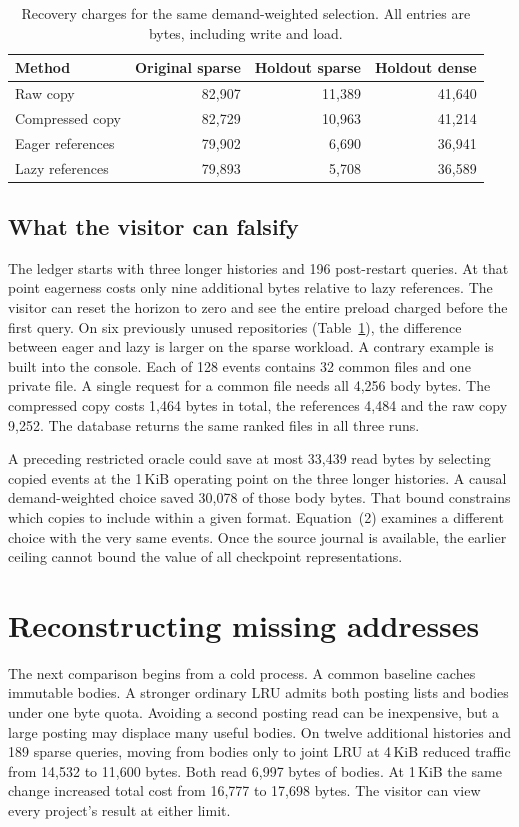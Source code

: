 \documentclass[conference]{IEEEtran}
\begin{document}
\begin{table}[t]\centering
\caption{Recovery charges for the same demand-weighted selection. All entries are bytes, including write and load.}\label{tab:restart}
\begin{tabular}{lrrr}\toprule
Method & Original sparse & Holdout sparse & Holdout dense\\
\midrule Raw copy & 82,907 & 11,389 & 41,640\\
Compressed copy & 82,729 & 10,963 & 41,214\\
Eager references & 79,902 & 6,690 & 36,941\\
Lazy references & 79,893 & 5,708 & 36,589\\
\bottomrule\end{tabular}
\end{table}

\subsection{What the visitor can falsify}
The ledger starts with three longer histories and 196 post-restart queries. At that point eagerness costs only nine additional bytes relative to lazy references. The visitor can reset the horizon to zero and see the entire preload charged before the first query. On six previously unused repositories (Table~\ref{tab:restart}), the difference between eager and lazy is larger on the sparse workload. A contrary example is built into the console. Each of 128 events contains 32 common files and one private file. A single request for a common file needs all 4,256 body bytes. The compressed copy costs 1,464 bytes in total, the references 4,484 and the raw copy 9,252. The database returns the same ranked files in all three runs.

A preceding restricted oracle could save at most 33,439 read bytes by selecting copied events at the 1\,KiB operating point on the three longer histories. A causal demand-weighted choice saved 30,078 of those body bytes. That bound constrains which copies to include within a given format. Equation~(2) examines a different choice with the very same events. Once the source journal is available, the earlier ceiling cannot bound the value of all checkpoint representations.

\section{Reconstructing missing addresses}
The next comparison begins from a cold process. A common baseline caches immutable bodies. A stronger ordinary LRU admits both posting lists and bodies under one byte quota. Avoiding a second posting read can be inexpensive, but a large posting may displace many useful bodies. On twelve additional histories and 189 sparse queries, moving from bodies only to joint LRU at 4\,KiB reduced traffic from 14,532 to 11,600 bytes. Both read 6,997 bytes of bodies. At 1\,KiB the same change increased total cost from 16,777 to 17,698 bytes. The visitor can view every project's result at either limit.
\end{document}
